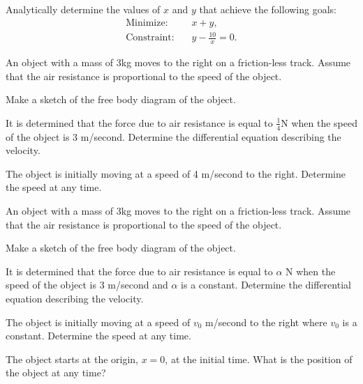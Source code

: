 \begin{problem}
  \item Analytically determine the values of $x$ and $y$ that achieve the
    following goals:
    \begin{eqnarray*}
      \mathrm{Minimize:} && x+y, \\
      \mathrm{Constraint:} && y - \frac{10}{x}  =  0.
    \end{eqnarray*}
    \vfill

  \clearpage

\item An object with a mass of 3kg moves to the right on a
  friction-less track. Assume that the air resistance is proportional
  to the speed of the object.
  \begin{subproblem}
  \item Make a sketch of the free body diagram of the object.
    \vfill
  \item It is determined that the force due to air resistance is equal
    to $\frac{1}{4}$N when the speed of the object is 3
    m/second. Determine the differential equation describing the velocity.
    \vfill
  \item The object is initially moving at a speed of 4 m/second to the
    right. Determine the speed at any time.
    \vfill
    \vfill
  \end{subproblem}

  \clearpage

\item An object with a mass of 3kg moves to the right on a
  friction-less track. Assume that the air resistance is proportional
  to the speed of the object.
  \begin{subproblem}
  \item Make a sketch of the free body diagram of the object.

    \vfill

  \item It is determined that the force due to air resistance is equal
    to $\alpha$ N when the speed of the object is 3 m/second and
    $\alpha$ is a constant. Determine the differential equation
    describing the velocity.

    \vfill
    \vfill

    \clearpage

  \item The object is initially moving at a speed of $v_0$ m/second to
    the right where $v_0$ is a constant. Determine the speed at any
    time.

    \vfill

  \item The object starts at the origin, $x=0$, at the initial
    time. What is the position of the object at any time?

    \vfill

  \end{subproblem}

\end{problem}

